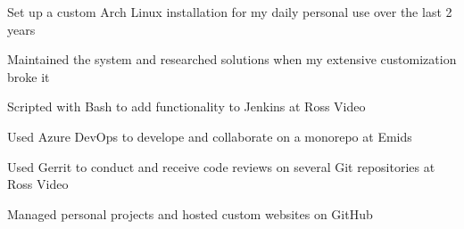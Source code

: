 \begin{bullets}
    \item Set up a custom Arch Linux installation for my daily personal use over the last 2 years
    \item Maintained the system and researched solutions when my extensive customization broke it
    \item Scripted with Bash to add functionality to Jenkins at Ross Video
\end{bullets}

\begin{bullets}
    \item Used Azure DevOps to develope and collaborate on a monorepo at Emids
    \item Used Gerrit to conduct and receive code reviews on several Git repositories at Ross Video
    \item Managed personal projects and hosted custom websites on GitHub
\end{bullets}
